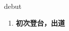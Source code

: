 
\begin{frame}
{\huge debut}
\begin{center}
\begin{enumerate}\Large
  \item \textbf{初次登台，出道}
\end{enumerate}
\end{center}
\end{frame}
